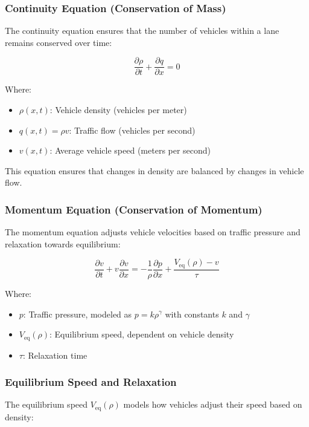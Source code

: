 \documentclass[conference]{IEEEtran}
\begin{document}
\subsubsection{Continuity Equation (Conservation of Mass)}
The continuity equation ensures that the number of vehicles within a lane remains conserved over time:

\begin{equation}
\frac{\partial \rho}{\partial t} + \frac{\partial q}{\partial x} = 0
\end{equation}

Where:
\begin{itemize}
    \item $\rho(x, t)$: Vehicle density (vehicles per meter)
    \item $q(x, t) = \rho v$: Traffic flow (vehicles per second)
    \item $v(x, t)$: Average vehicle speed (meters per second)
\end{itemize}

This equation ensures that changes in density are balanced by changes in vehicle flow.

\subsubsection{Momentum Equation (Conservation of Momentum)}
The momentum equation adjusts vehicle velocities based on traffic pressure and relaxation towards equilibrium:

\begin{equation}
\frac{\partial v}{\partial t} + v \frac{\partial v}{\partial x} = -\frac{1}{\rho} \frac{\partial p}{\partial x} + \frac{V_{\text{eq}}(\rho) - v}{\tau}
\end{equation}

Where:
\begin{itemize}
    \item $p$: Traffic pressure, modeled as $p = k \rho^\gamma$ with constants $k$ and $\gamma$
    \item $V_{\text{eq}}(\rho)$: Equilibrium speed, dependent on vehicle density
    \item $\tau$: Relaxation time
\end{itemize}

\subsubsection{Equilibrium Speed and Relaxation}
The equilibrium speed $V_{\text{eq}}(\rho)$ models how vehicles adjust their speed based on density:
\end{document}
